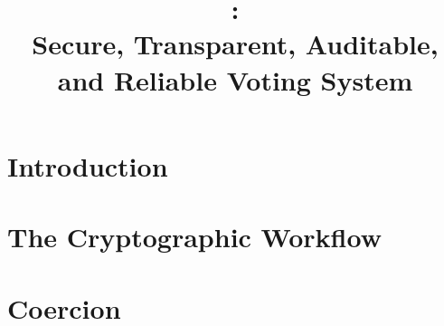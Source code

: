 \documentclass[letterpaper, 10pt, twocolumn]{article}
\title{\projname: \\
Secure, Transparent, Auditable, and Reliable Voting System}
\begin{document}
\maketitle

\begin{abstract}

\end{abstract}

\section{Introduction}


\section{The Cryptographic Workflow}


\section{Coercion}




\end{document}
